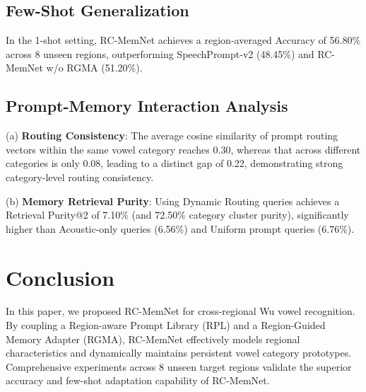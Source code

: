 \documentclass[letterpaper]{article} %
\begin{document}
\subsection{Few-Shot Generalization}
In the 1-shot setting, RC-MemNet achieves a region-averaged Accuracy of 56.80\% across 8 unseen regions, outperforming SpeechPrompt-v2 (48.45\%) and RC-MemNet w/o RGMA (51.20\%).

\subsection{Prompt-Memory Interaction Analysis}
(a) \textbf{Routing Consistency}: The average cosine similarity of prompt routing vectors within the same vowel category reaches 0.30, whereas that across different categories is only 0.08, leading to a distinct gap of 0.22, demonstrating strong category-level routing consistency.

(b) \textbf{Memory Retrieval Purity}: Using Dynamic Routing queries achieves a Retrieval Purity@2 of 7.10\% (and 72.50\% category cluster purity), significantly higher than Acoustic-only queries (6.56\%) and Uniform prompt queries (6.76\%).

\section{Conclusion}
In this paper, we proposed RC-MemNet for cross-regional Wu vowel recognition. By coupling a Region-aware Prompt Library (RPL) and a Region-Guided Memory Adapter (RGMA), RC-MemNet effectively models regional characteristics and dynamically maintains persistent vowel category prototypes. Comprehensive experiments across 8 unseen target regions validate the superior accuracy and few-shot adaptation capability of RC-MemNet.


\end{document}
